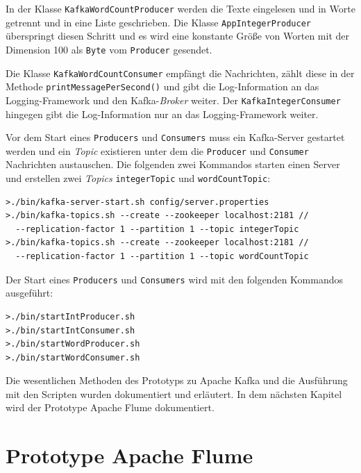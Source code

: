 In der Klasse \texttt{KafkaWordCountProducer} werden die Texte eingelesen und in Worte getrennt und in eine Liste geschrieben. Die Klasse \texttt{AppIntegerProducer} überspringt diesen Schritt und es wird eine konstante Größe von Worten mit der Dimension 100 als \texttt{Byte} vom \texttt{Producer} gesendet.

Die Klasse \texttt{KafkaWordCountConsumer} empfängt die Nachrichten, zählt diese in der Methode \texttt{printMessagePerSecond()} und gibt die Log-Information an das Logging-Framework und den Kafka-\textit{Broker} weiter. Der \texttt{KafkaIntegerConsumer} hingegen gibt die Log-Information nur an das Logging-Framework weiter.

Vor dem Start eines \texttt{Producers} und \texttt{Consumers} muss ein Kafka-Server gestartet werden und ein \textit{Topic} existieren unter dem die \texttt{Producer} und \texttt{Consumer} Nachrichten austauschen. Die folgenden zwei Kommandos starten einen Server und erstellen zwei \textit{Topics} \texttt{integerTopic} und \texttt{wordCountTopic}:

\begin{verbatim}
>./bin/kafka-server-start.sh config/server.properties
>./bin/kafka-topics.sh --create --zookeeper localhost:2181 // 
  --replication-factor 1 --partition 1 --topic integerTopic
>./bin/kafka-topics.sh --create --zookeeper localhost:2181 // 
  --replication-factor 1 --partition 1 --topic wordCountTopic
\end{verbatim}

Der Start eines \texttt{Producers} und \texttt{Consumers} wird mit den folgenden Kommandos ausgeführt:

\begin{verbatim}
>./bin/startIntProducer.sh
>./bin/startIntConsumer.sh
>./bin/startWordProducer.sh
>./bin/startWordConsumer.sh
\end{verbatim}

Die wesentlichen Methoden des Prototyps zu Apache Kafka und die Ausführung mit den Scripten wurden dokumentiert und erläutert. In dem nächsten Kapitel wird der Prototype Apache Flume dokumentiert.


\section{Prototype Apache Flume}
\label{sec:prot:flume}

